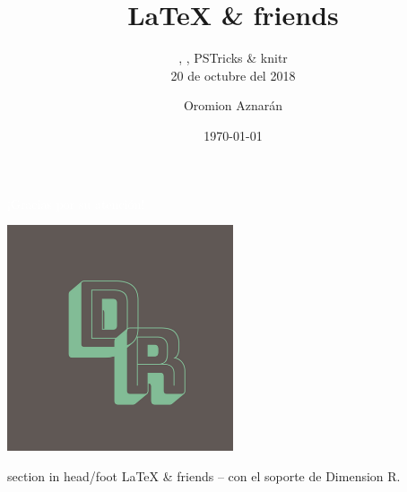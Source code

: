 \documentclass[spanish]{beamer}
\title[\LaTeX{} \& friends]{\LaTeX{} \& friends}%
\subtitle{\sagewhite, \ararawhite, PSTricks \& knitr\\[\baselineskip]
20 de octubre del 2018}
\author[Dimension R]{Oromion Aznarán}
\institute[Universidad Nacional de Ingeniería]{Matemáticas\\
Facultad de Ciencias\\
Universidad Nacional de Ingeniería}
\date[\today]{\today}
\begin{document}
\begin{frame}
\titlepage
\end{frame}

\begin{frame}
\frametitle{\contentsname}
\tableofcontents
\end{frame}







\begin{frame}[plain,b]
\centering
\huge \textcolor{white}{¡Gracias por su atención!}
\normalsize
\begin{center}
	\includegraphics[width=0.5\textwidth]{DimensionR}\\
\end{center}
\vspace*{\fill}

\begin{beamercolorbox}[wd=\paperwidth]{section in head/foot}
\centering\large
\LaTeX{} \& friends -- con el soporte de Dimension R.
\vskip10pt
\end{beamercolorbox}
\end{frame}
\end{document}
